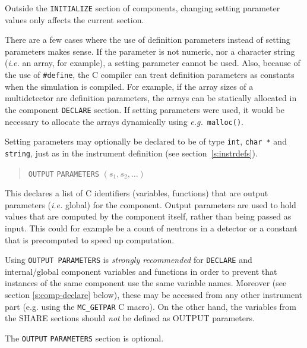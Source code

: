 Outside the \verb+INITIALIZE+ section of components, changing setting parameter
values only affects the current section.

There are a few cases where the use of definition parameters instead of
setting parameters makes sense. If the parameter is not numeric, nor a character string ({\em i.e.} an
array, for example), a setting parameter cannot be
used. Also, because of the use of \verb+#define+, the C compiler can
treat definition parameters as constants when the simulation is
compiled. For example, if the array sizes of a multidetector are
definition parameters, the arrays can be statically allocated in the
component \verb+DECLARE+ section. If setting parameters were used, it
would be necessary to allocate the arrays dynamically using {\em e.g.}\
\verb+malloc()+.

Setting parameters may optionally be declared to be of type \verb+int+,
\verb+char *+ and \verb+string+, just as in the instrument definition (see
section~\ref{s:instrdefs}).

\begin{quote}
  \texttt{OUTPUT} \texttt{PARAMETERS} $(s_1, s_2, \ldots)$
\end{quote}
This declares a list of C identifiers (variables, functions) that are
output parameters ({\it i.e.} global) for the
component. Output parameters are used to hold values that are computed
by the component itself, rather than being passed as input. This could
for example be a count of neutrons in a detector or a constant that is
precomputed to speed up computation.

Using \texttt{OUTPUT PARAMETERS} is \emph{strongly recommended} for
\texttt{DECLARE} and internal/global component variables and functions in order
to prevent that instances of the same component use the same variable
names. Moreover (see section \ref{s:comp-declare} below), these may be accessed
from any other instrument part (e.g. using the \verb+MC_GETPAR+ C macro).  On
the other hand, the variables from the SHARE sections should \emph{not} be
defined as OUTPUT parameters.

The \texttt{OUTPUT} \texttt{PARAMETERS} section is optional.

